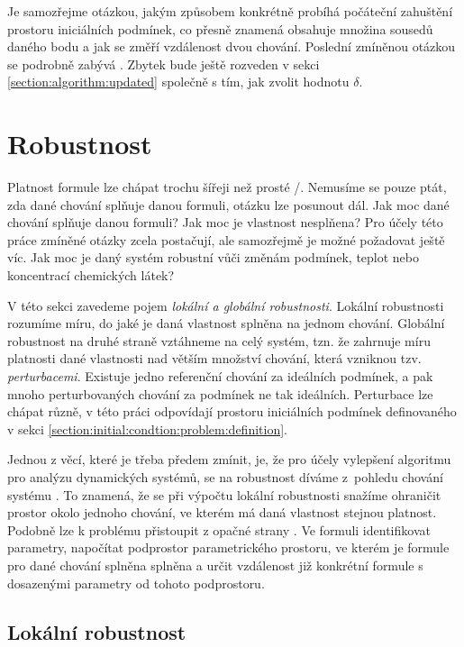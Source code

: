 Je samozřejme otázkou, jakým způsobem konkrétně probíhá počáteční zahuštění prostoru
iniciálních podmínek, co přesně znamená obsahuje mno\-žina sousedů daného bodu a jak
se změří vzdálenost dvou chování. Poslední zmíněnou otázkou se podrobně zabývá \cite{drazan2011}.
Zbytek bude ještě rozveden v sekci \ref{section:algorithm:updated} společně s tím,
jak zvolit hodnotu $\delta$.

\section{Robustnost}\label{section:robustness}

Platnost formule lze chápat trochu šířeji než prosté /.
Nemusíme se pouze ptát, zda dané chování splňuje danou formuli, otázku lze posunout dál.
Jak moc dané chování splňuje danou formuli? Jak moc je vlastnost nesplňena? Pro účely
této práce zmíněné otázky zcela postačují, ale samozřejmě je možné požadovat ještě víc.
Jak moc je daný systém robustní vůči změnám podmínek, teplot nebo koncentrací
chemických látek?

V této sekci zavedeme pojem \textit{lokální a globální robustnosti}. Lokální robustnosti
rozumíme míru, do jaké je daná vlastnost splněna na jednom chování. Globální robustnost
na druhé straně vztáhneme na celý systém, tzn. že zahrnuje míru platnosti dané vlastnosti
nad větším množství chování, která vzniknou tzv. \textit{perturbacemi}. Existuje jedno
referenční chování za ideálních podmínek, a pak mnoho perturbovaných chování za podmínek
ne tak i\-deál\-ních. Perturbace lze chápat různě, v této práci odpovídají prostoru i\-ni\-ciál\-ních
podmínek definovaného v sekci \ref{section:initial:condtion:problem:definition}. 

Jednou z věcí, které je třeba předem zmínit, je, že pro účely vylepšení algoritmu pro
analýzu dynamických systémů, se na robustnost díváme z~pohledu chování systému \cite{donze2011}.
To znamená, že se při výpočtu lokální robustnosti snažíme ohraničit prostor okolo jednoho chování,
ve kterém má daná vlastnost stejnou platnost. Podobně lze k problému přistoupit z opačné strany \cite{rizk2009}.
Ve formuli identifikovat parametry, napočítat podprostor parametrického prostoru, ve kterém je formule
pro dané chování splněna splněna a určit vzdálenost již konkrétní formule s dosazenými parametry
od tohoto podprostoru.

\subsection{Lokální robustnost}

